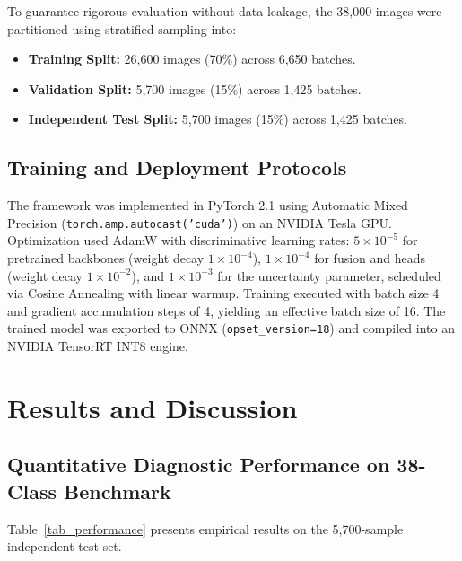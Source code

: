 \documentclass[runningheads]{llncs}
\begin{document}
To guarantee rigorous evaluation without data leakage, the 38,000 images were partitioned using stratified sampling into:
\begin{itemize}
    \item \textbf{Training Split:} 26,600 images (70\%) across 6,650 batches.
    \item \textbf{Validation Split:} 5,700 images (15\%) across 1,425 batches.
    \item \textbf{Independent Test Split:} 5,700 images (15\%) across 1,425 batches.
\end{itemize}

\subsection{Training and Deployment Protocols}
The framework was implemented in PyTorch 2.1 using Automatic Mixed Precision (\texttt{torch.amp.autocast('cuda')}) on an NVIDIA Tesla GPU. Optimization used AdamW with discriminative learning rates: $5 \times 10^{-5}$ for pretrained backbones (weight decay $1 \times 10^{-4}$), $1 \times 10^{-4}$ for fusion and heads (weight decay $1 \times 10^{-2}$), and $1 \times 10^{-3}$ for the uncertainty parameter, scheduled via Cosine Annealing with linear warmup. Training executed with batch size 4 and gradient accumulation steps of 4, yielding an effective batch size of 16. The trained model was exported to ONNX (\texttt{opset\_version=18}) and compiled into an NVIDIA TensorRT INT8 engine.

\section{Results and Discussion}
\subsection{Quantitative Diagnostic Performance on 38-Class Benchmark}
Table~\ref{tab_performance} presents empirical results on the 5,700-sample independent test set.

\begin{table}[!htbp]
\centering
\caption{Diagnostic performance on the 38-class plant disease independent test set.}
\label{tab_performance}
\end{table}
\end{document}
